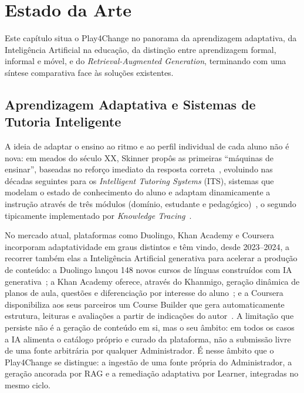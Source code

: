 %
%
\chapter{Estado da Arte} \label{cap:estadodaarte}

Este capítulo situa o Play4Change no panorama da aprendizagem adaptativa, da Inteligência Artificial na educação, da distinção entre aprendizagem formal, informal e móvel, e do \textit{Retrieval-Augmented Generation}, terminando com uma síntese comparativa face às soluções existentes.

\section{Aprendizagem Adaptativa e Sistemas de Tutoria Inteligente} \label{sec:its}

A ideia de adaptar o ensino ao ritmo e ao perfil individual de cada aluno não é nova: em meados do século XX, Skinner propôs as primeiras ``máquinas de ensinar'', baseadas no reforço imediato da resposta correta~\cite{skinner1958}, evoluindo nas décadas seguintes para os \textit{Intelligent Tutoring Systems} (ITS), sistemas que modelam o estado de conhecimento do aluno e adaptam dinamicamente a instrução através de três módulos (domínio, estudante e pedagógico)~\cite{anderson1985,vanlehn2011}, o segundo tipicamente implementado por \textit{Knowledge Tracing}~\cite{corbett1994,piech2015}.

No mercado atual, plataformas como Duolingo, Khan Academy e Coursera incorporam adaptatividade em graus distintos e têm vindo, desde 2023--2024, a recorrer também elas a Inteligência Artificial generativa para acelerar a produção de conteúdo: a Duolingo lançou 148 novos cursos de línguas construídos com IA generativa~\cite{duolingo2025ai}; a Khan Academy oferece, através do Khanmigo, geração dinâmica de planos de aula, questões e diferenciação por interesse do aluno~\cite{khanmigo2025}; e a Coursera disponibiliza aos seus parceiros um Course Builder que gera automaticamente estrutura, leituras e avaliações a partir de indicações do autor~\cite{coursera2024coursebuilder}. A limitação que persiste não é a geração de conteúdo em si, mas o seu âmbito: em todos os casos a IA alimenta o catálogo próprio e curado da plataforma, não a submissão livre de uma fonte arbitrária por qualquer Administrador. É nesse âmbito que o Play4Change se distingue: a ingestão de uma fonte própria do Administrador, a geração ancorada por RAG e a remediação adaptativa por Learner, integradas no mesmo ciclo.

